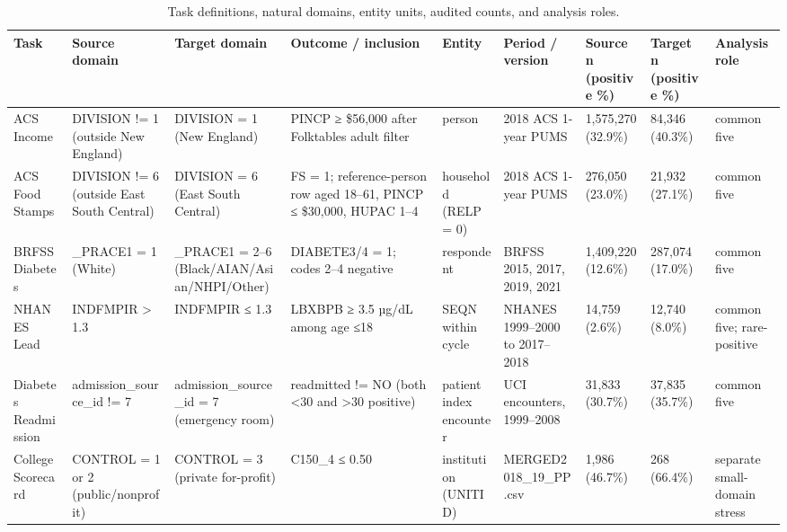 \begin{table}[t]
\centering
\footnotesize
\begin{tabular}{lllllllll}
\toprule
Task & Source domain & Target domain & Outcome / inclusion & Entity & Period / version & Source n (positive \%) & Target n (positive \%) & Analysis role \\
\midrule
ACS Income & DIVISION != 1 (outside New England) & DIVISION = 1 (New England) & PINCP ≥ \$56,000 after Folktables adult filter & person & 2018 ACS 1-year PUMS & 1,575,270 (32.9\%) & 84,346 (40.3\%) & common five \\
ACS Food Stamps & DIVISION != 6 (outside East South Central) & DIVISION = 6 (East South Central) & FS = 1; reference-person row aged 18–61, PINCP ≤ \$30,000, HUPAC 1–4 & household (RELP = 0) & 2018 ACS 1-year PUMS & 276,050 (23.0\%) & 21,932 (27.1\%) & common five \\
BRFSS Diabetes & \_PRACE1 = 1 (White) & \_PRACE1 = 2–6 (Black/AIAN/Asian/NHPI/Other) & DIABETE3/4 = 1; codes 2–4 negative & respondent & BRFSS 2015, 2017, 2019, 2021 & 1,409,220 (12.6\%) & 287,074 (17.0\%) & common five \\
NHANES Lead & INDFMPIR > 1.3 & INDFMPIR ≤ 1.3 & LBXBPB ≥ 3.5 µg/dL among age ≤18 & SEQN within cycle & NHANES 1999–2000 to 2017–2018 & 14,759 (2.6\%) & 12,740 (8.0\%) & common five; rare-positive \\
Diabetes Readmission & admission\_source\_id != 7 & admission\_source\_id = 7 (emergency room) & readmitted != NO (both <30 and >30 positive) & patient index encounter & UCI encounters, 1999–2008 & 31,833 (30.7\%) & 37,835 (35.7\%) & common five \\
College Scorecard & CONTROL = 1 or 2 (public/nonprofit) & CONTROL = 3 (private for-profit) & C150\_4 ≤ 0.50 & institution (UNITID) & MERGED2018\_19\_PP.csv & 1,986 (46.7\%) & 268 (66.4\%) & separate small-domain stress \\
\bottomrule
\end{tabular}
\caption{Task definitions, natural domains, entity units, audited counts, and analysis roles.}
\label{tab:tasks}
\end{table}

